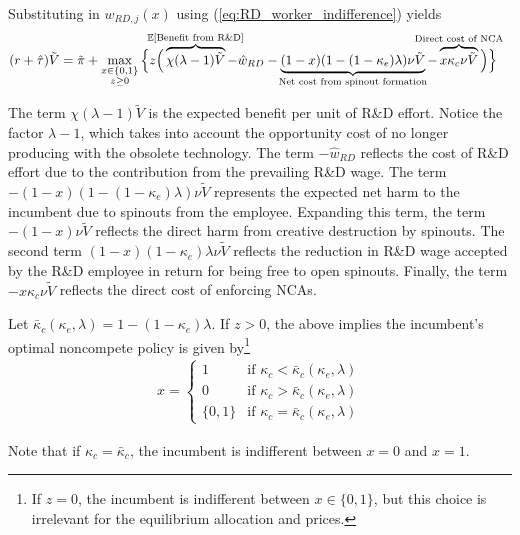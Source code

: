 \documentclass[11pt,english]{article}
\theoremstyle{remark}
\begin{document}
Substituting in $w_{RD,j}(x)$ using (\ref{eq:RD_worker_indifference}) yields
\begin{align}
	(r + \hat{\tau}) \tilde{V} &= \tilde{\pi} + \max_{\substack{x \in \{0,1\} \\ z \ge 0}} \Big\{z \Big( \overbrace{\chi (\lambda - 1) \tilde{V}}^{\mathclap{\mathbb{E}[\textrm{Benefit from R\&D}]}}- \hat{w}_{RD} -  \underbrace{(1-x)(1 - (1-\kappa_{e})\lambda)\nu \tilde{V}}_{\mathclap{\text{Net cost from spinout formation}}} - \overbrace{x \kappa_{c} \nu \tilde{V}}^{\mathclap{\text{Direct cost of NCA}}}\Big) \Big\} \label{eq:hjb_incumbent_workerIndiff}
\end{align}

The term $\chi(\lambda -1) \tilde{V}$ is the expected benefit per unit of R\&D effort. Notice the factor $\lambda -1$, which takes into account the opportunity cost of no longer producing with the obsolete technology. The term $-\hat{w}_{RD}$ reflects the cost of R\&D effort due to the contribution from the prevailing R\&D wage. The term $-(1-x)(1 - (1-\kappa_e) \lambda) \nu \tilde{V}$ represents the expected net harm to the incumbent due to spinouts from the employee. Expanding this term, the term $-(1-x)\nu \tilde{V}$ reflects the direct harm from creative destruction by spinouts. The second term $(1-x)(1-\kappa_e)\lambda \nu \tilde{V}$ reflects the reduction in R\&D wage accepted by the R\&D employee in return for being free to open spinouts. Finally, the term $-x \kappa_c \nu \tilde{V}$ reflects the direct cost of enforcing NCAs.

Let $\bar{\kappa}_c (\kappa_e, \lambda) = 1 - (1-\kappa_e)\lambda$. If $z > 0$, the above implies the incumbent's optimal noncompete policy is given by\footnote{If $z = 0$, the incumbent is indifferent between $x \in\{0,1\}$, but this choice is irrelevant for the equilibrium allocation and prices.} 
\begin{align}
x = \begin{cases}
1 & \textrm{if } \kappa_{c} < \bar{\kappa}_c (\kappa_e, \lambda) \\
0 & \textrm{if } \kappa_{c} > \bar{\kappa}_c (\kappa_e, \lambda)\\
\{0,1\} & \textrm{if } \kappa_c = \bar{\kappa}_c (\kappa_e, \lambda) 
\end{cases} \label{eq_nca_policy}
\end{align}

Note that if $\kappa_c = \bar{\kappa}_c$, the incumbent is indifferent between $x = 0$ and $x = 1$.
\end{document}
